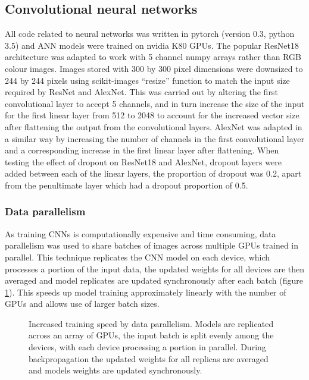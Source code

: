 \documentclass[a4paper,11pt,twoside,openright]{scrbook}
\begin{document}
\subsection{Convolutional neural networks}

All code related to neural networks was written in pytorch (version 0.3, python 3.5) and ANN models were trained on 
nvidia K80 GPUs.
The popular ResNet18 architecture was adapted to work with 5 channel numpy arrays rather than RGB colour images.
Images stored with 300 by 300 pixel dimensions were downsized to 244 by 244 pixels using scikit-images ``resize'' 
function to match the input size required by ResNet and AlexNet.
This was carried out by altering the first convolutional layer to accept 5 channels, and in turn increase the size of 
the input for the first linear layer from 512 to 2048 to account for the increased vector size after flattening the 
output from the convolutional layers.
AlexNet was adapted in a similar way by increasing the number of channels in the first convolutional layer and a 
corresponding increase in the first linear layer after flattening.
When testing the effect of dropout on ResNet18 and AlexNet, dropout layers were added between each of the linear 
layers, the proportion of dropout was 0.2, apart from the penultimate layer which had a dropout proportion of 0.5.


\subsubsection{Data parallelism}

As training CNNs is computationally expensive and time consuming, data parallelism was used to share batches of images 
across multiple GPUs trained in parallel.
This technique replicates the CNN model on each device, which processes a portion of the input data, the updated 
weights for all devices are then averaged and model replicates are updated synchronously after each batch (figure 
\ref{figure:multi_GPU}).
This speeds up model training approximately linearly with the number of GPUs and allows use of larger batch sizes.

\begin{figure}
    \captionsetup{width=0.8\textwidth}
    \caption[Multi-GPU distributed training]{Increased training speed by data parallelism. Models are replicated across 
an array of GPUs, the input batch is split evenly among the devices, with each device processing a portion in parallel.
During backpropagation the updated weights for all replicas are averaged and models weights are updated synchronously.}
    
    \label{figure:multi_GPU}
\end{figure}
\end{document}
